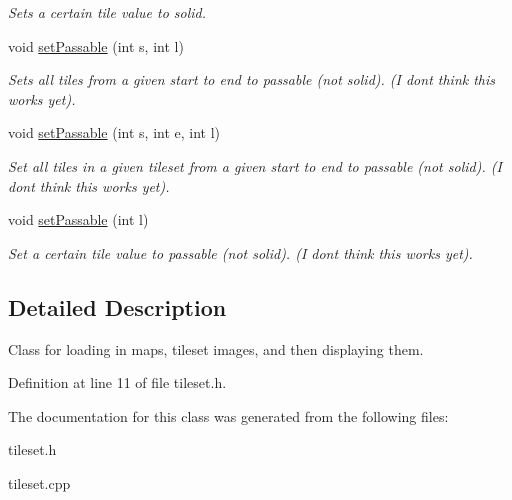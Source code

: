 \begin{DoxyCompactItemize}
\begin{DoxyCompactList}\small\item\em Sets a certain tile value to solid. \end{DoxyCompactList}\item 
void \hyperlink{classTileset_a9daba755264c94a3ef853078757257df}{set\+Passable} (int s, int l)\hypertarget{classTileset_a9daba755264c94a3ef853078757257df}{}\label{classTileset_a9daba755264c94a3ef853078757257df}

\begin{DoxyCompactList}\small\item\em Sets all tiles from a given start to end to passable (not solid). (I don\textquotesingle{}t think this works yet). \end{DoxyCompactList}\item 
void \hyperlink{classTileset_aec937b8a59ca974a5218d701306fd131}{set\+Passable} (int s, int e, int l)\hypertarget{classTileset_aec937b8a59ca974a5218d701306fd131}{}\label{classTileset_aec937b8a59ca974a5218d701306fd131}

\begin{DoxyCompactList}\small\item\em Set all tiles in a given tileset from a given start to end to passable (not solid). (I don\textquotesingle{}t think this works yet). \end{DoxyCompactList}\item 
void \hyperlink{classTileset_a8bf20786d91f89d46e0aca5667a79164}{set\+Passable} (int l)\hypertarget{classTileset_a8bf20786d91f89d46e0aca5667a79164}{}\label{classTileset_a8bf20786d91f89d46e0aca5667a79164}

\begin{DoxyCompactList}\small\item\em Set a certain tile value to passable (not solid). (I don\textquotesingle{}t think this works yet). \end{DoxyCompactList}\end{DoxyCompactItemize}


\subsection{Detailed Description}
Class for loading in maps, tileset images, and then displaying them. 

Definition at line 11 of file tileset.\+h.



The documentation for this class was generated from the following files\+:\begin{DoxyCompactItemize}
\item 
tileset.\+h\item 
tileset.\+cpp\end{DoxyCompactItemize}
